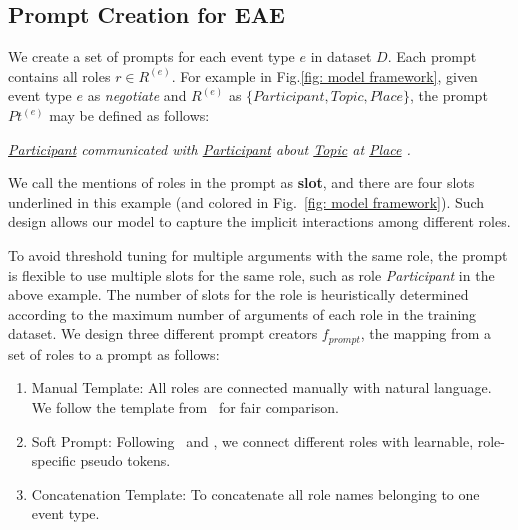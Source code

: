 \subsection{Prompt Creation for EAE}
\label{subsec: joint prompt creation}
We create a set of prompts for each event type $e$ in dataset $D$. Each prompt contains all roles $r \in R^{(e)}$. For example in Fig.\ref{fig: model framework}, given event type $e$ as \textit{negotiate} and $R^{(e)}$ as $\{\textit{Participant}, \textit{Topic}, \textit{Place}\}$, the prompt $Pt^{(e)}$ may be defined as follows:

\textit{\underline{Participant} communicated with \underline{Participant} about \underline{Topic} at \underline{Place} .}

We call the mentions of roles in the prompt as \textbf{slot}, and there are four slots underlined in this example (and colored in Fig.~\ref{fig: model framework}). Such design allows our model to capture the implicit interactions among different roles.

To avoid threshold tuning for multiple arguments with the same role, 
the prompt is flexible to use multiple slots for the same role, such as role \textit{Participant} in the above example. The number of slots for the role is heuristically determined according to the maximum number of arguments of each role in the training dataset. We design three different prompt creators $f_{prompt}$, the mapping from a set of roles to a prompt as follows:
\begin{enumerate}[leftmargin=*]
    \setlength{\parskip}{0pt}
   \setlength{\itemsep}{0pt plus 1pt}
    \item Manual Template: All roles are connected manually with natural language. We follow the template from~\citet{li-etal-2021-document} for fair comparison.
    \item Soft Prompt: Following~\citet{qin-eisner-2021-learning} and \citet{liu2021gpt}, we connect different roles with learnable, role-specific pseudo tokens.
    \item Concatenation Template: To concatenate all role names belonging to one event type.
\end{enumerate}


